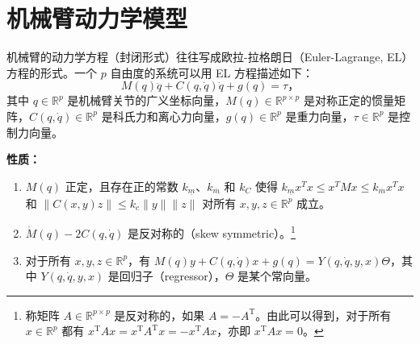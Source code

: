 \section{机械臂动力学模型}\label{6Aref}

机械臂的动力学方程（封闭形式）往往写成欧拉-拉格朗日（Euler-Lagrange, EL）方程的形式。一个 $p$ 自由度的系统可以用 EL 方程描述如下：
\begin{equation} \label{robotic_model}
    M(q) \ddot{q} + C(q, \dot{q}) \dot{q} + g(q) = \tau \text{，}
\end{equation}
其中 $q \in \mathbb{R}^p$ 是机械臂关节的广义坐标向量，$M(q) \in \mathbb{R}^{p \times p}$ 是对称正定的惯量矩阵，$C(q, \dot{q}) \in \mathbb{R}^p$ 是科氏力和离心力向量，$g(q)\in \mathbb{R}^p$ 是重力向量，$\tau \in \mathbb{R}^p$ 是控制力向量。

\noindent\textbf{性质：}
\begin{enumerate}
    \item $M(q)$ 正定，且存在正的常数 $k_{\underline{m}}$、$k_{\overline{m}}$ 和 $k_C$ 使得 $k_{\underline{m}} x^T x \leq x^T M x \leq k_{\overline{m}} x^T x$ 和 $\| C (x, y) z \| \leq k_c \| y \| \| z \|$ 对所有 $x, y , z \in \mathbb{R}^p$ 成立。
    \item $\dot{M} (q) - 2 C (q, \dot{q})$ 是反对称的（skew symmetric）。\footnote{称矩阵 $A \in \mathbb{R}^{p \times p}$ 是反对称的，如果 $A = - A^\mathrm{T}$。由此可以得到，对于所有 $x \in \mathbb{R}^p$ 都有 $x^\mathrm{T} A x = x^\mathrm{T} A^\mathrm{T} x = - x^\mathrm{T} A x$，亦即 $x^\mathrm{T} A x = 0$。}
    \item 对于所有 $x, y , z \in \mathbb{R}^p$，有 $M (q) y + C (q, \dot{q}) x + g (q) = Y (q, \dot{q}, y, x) \Theta$，其中 $Y (q, \dot{q}, y, x)$ 是回归子（regressor），$\Theta$ 是某个常向量。
\end{enumerate}
